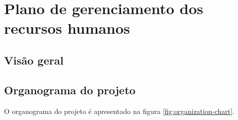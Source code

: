
\chapter{Plano de gerenciamento dos recursos humanos}
\label{ch:human-resource-management-plan}

\section{Visão geral}


\section{Organograma do projeto}

O organograma do projeto é apresentado na figura \ref{fig:organization-chart}.

